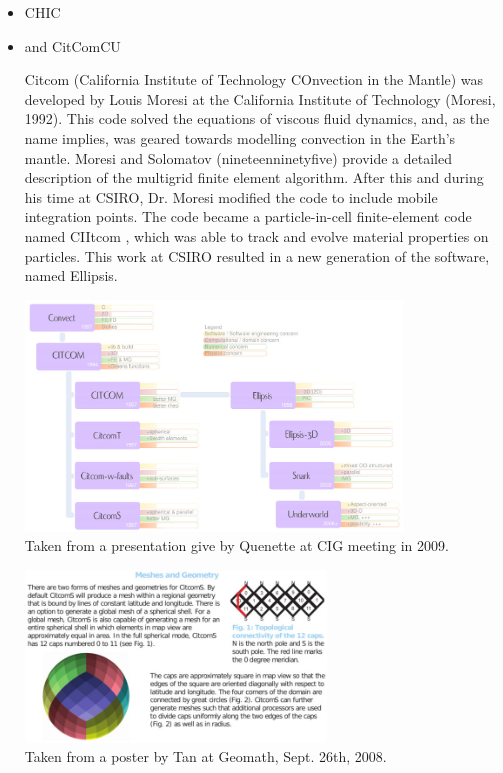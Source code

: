 \begin{itemize}
\item {\codefont CHIC}  

\begin{scriptsize}
\cite{norv15}
\end{scriptsize}

\item \citcoms and {\codefont CitComCU} 

Citcom (California Institute of Technology COnvection in the Mantle) was  developed by Louis
Moresi at the California Institute of Technology (Moresi, 1992). This code solved the equations
of viscous fluid dynamics, and, as the name implies, was geared towards modelling convection in
the Earth’s mantle. Moresi and Solomatov (nineteenninetyfive) provide a detailed description of the multigrid
finite element algorithm. After this and during his time at CSIRO, Dr. Moresi modified the code to
include mobile integration points. The code became a particle-in-cell finite-element code named
CIItcom , which was able to track and evolve material properties on particles. This work at
CSIRO resulted in a new generation of the software, named Ellipsis.

\begin{center}
\includegraphics[width=10cm]{images/codes/quenette_cig_2009}\\
{\captionfont Taken from a presentation give by Quenette at CIG meeting in 2009.}
\end{center}

\begin{center}
\includegraphics[width=8cm]{images/codes/CitcomS}\\
{\captionfont Taken from a poster by Tan \etal at Geomath, Sept. 26th, 2008.}
\end{center}


\end{itemize}
